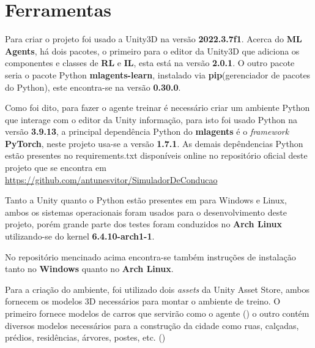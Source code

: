 \chapter{Ferramentas}\label{cap:ferramentas}

Para criar o projeto foi usado a Unity3D na versão \textbf{2022.3.7f1}. Acerca do \textbf{ML Agents}, há dois pacotes, o primeiro para o editor da Unity3D que adiciona os componentes e classes de \textbf{RL} e \textbf{IL}, esta está na versão \textbf{2.0.1}. O outro pacote seria o pacote Python \textbf{mlagents-learn}, instalado via \textbf{pip}(gerenciador de pacotes do Python), este encontra-se na versão \textbf{0.30.0}. 

Como foi dito, para fazer o agente treinar é necessário criar um ambiente Python que interage com o editor da Unity informação, para isto foi usado Python na versão \textbf{3.9.13}, a principal dependência Python do \textbf{mlagents} é o \textit{framework} \textbf{PyTorch}, neste projeto usa-se a versão \textbf{1.7.1}. As demais depêndencias Python estão presentes no requirements.txt disponíveis online no repositório oficial deste projeto que se encontra em \href{https://github.com/antunesvitor/SimuladorDeConducao}{https://github.com/antunesvitor/SimuladorDeConducao}

Tanto a Unity quanto o Python estão presentes em para Windows e Linux, ambos os sistemas operacionais foram usados para o desenvolvimento deste projeto, porém grande parte dos testes foram conduzidos no \textbf{Arch Linux} utilizando-se do kernel \textbf{6.4.10-arch1-1}.


No repositório mencinado acima encontra-se também instruções de instalação tanto no \textbf{Windows} quanto no \textbf{Arch Linux}.

Para a criação do ambiente, foi utilizado dois \textit{assets} da Unity Asset Store, ambos fornecem os modelos 3D necessários para montar o ambiente de treino. O primeiro fornece modelos de carros que servirão como o agente () o outro contém diversos modelos necessários para a construção da cidade como ruas, calçadas, prédios, residências, árvores, postes, etc. ()

